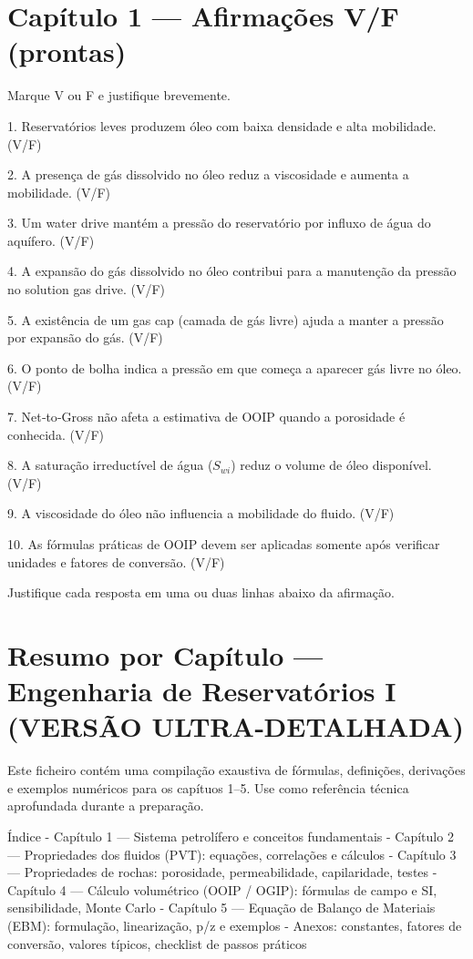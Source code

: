 \documentclass[11pt,a4paper]{article}
\begin{document}
\section{Capítulo 1 — Afirmações V/F (prontas)}

Marque V ou F e justifique brevemente.

1. Reservatórios leves produzem óleo com baixa densidade e alta mobilidade. (V/F)

2. A presença de gás dissolvido no óleo reduz a viscosidade e aumenta a mobilidade. (V/F)

3. Um water drive mantém a pressão do reservatório por influxo de água do aquífero. (V/F)

4. A expansão do gás dissolvido no óleo contribui para a manutenção da pressão no solution gas drive. (V/F)

5. A existência de um gas cap (camada de gás livre) ajuda a manter a pressão por expansão do gás. (V/F)

6. O ponto de bolha indica a pressão em que começa a aparecer gás livre no óleo. (V/F)

7. Net‑to‑Gross não afeta a estimativa de OOIP quando a porosidade é conhecida. (V/F)

8. A saturação irreductível de água ($S_{wi}$) reduz o volume de óleo disponível. (V/F)

9. A viscosidade do óleo não influencia a mobilidade do fluido. (V/F)

10. As fórmulas práticas de OOIP devem ser aplicadas somente após verificar unidades e fatores de conversão. (V/F)


Justifique cada resposta em uma ou duas linhas abaixo da afirmação.
\section{Resumo por Capítulo — Engenharia de Reservatórios I (VERSÃO ULTRA‑DETALHADA)}

Este ficheiro contém uma compilação exaustiva de fórmulas, definições, derivações e exemplos numéricos para os capítuos 1–5. Use como referência técnica aprofundada durante a preparação.

Índice
- Capítulo 1 — Sistema petrolífero e conceitos fundamentais
- Capítulo 2 — Propriedades dos fluidos (PVT): equações, correlações e cálculos
- Capítulo 3 — Propriedades de rochas: porosidade, permeabilidade, capilaridade, testes
- Capítulo 4 — Cálculo volumétrico (OOIP / OGIP): fórmulas de campo e SI, sensibilidade, Monte Carlo
- Capítulo 5 — Equação de Balanço de Materiais (EBM): formulação, linearização, p/z e exemplos
- Anexos: constantes, fatores de conversão, valores típicos, checklist de passos práticos
\end{document}
